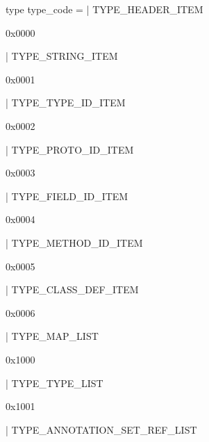 \documentclass[11pt]{article}
\begin{document}
\label{type:Dex.type-underscorecode}\begin{ocamldoccode}
type type_code =
  | TYPE_HEADER_ITEM
\end{ocamldoccode}
\begin{ocamldoccomment}
0x0000
\end{ocamldoccomment}
\begin{ocamldoccode}
  | TYPE_STRING_ITEM
\end{ocamldoccode}
\begin{ocamldoccomment}
0x0001
\end{ocamldoccomment}
\begin{ocamldoccode}
  | TYPE_TYPE_ID_ITEM
\end{ocamldoccode}
\begin{ocamldoccomment}
0x0002
\end{ocamldoccomment}
\begin{ocamldoccode}
  | TYPE_PROTO_ID_ITEM
\end{ocamldoccode}
\begin{ocamldoccomment}
0x0003
\end{ocamldoccomment}
\begin{ocamldoccode}
  | TYPE_FIELD_ID_ITEM
\end{ocamldoccode}
\begin{ocamldoccomment}
0x0004
\end{ocamldoccomment}
\begin{ocamldoccode}
  | TYPE_METHOD_ID_ITEM
\end{ocamldoccode}
\begin{ocamldoccomment}
0x0005
\end{ocamldoccomment}
\begin{ocamldoccode}
  | TYPE_CLASS_DEF_ITEM
\end{ocamldoccode}
\begin{ocamldoccomment}
0x0006
\end{ocamldoccomment}
\begin{ocamldoccode}
  | TYPE_MAP_LIST
\end{ocamldoccode}
\begin{ocamldoccomment}
0x1000
\end{ocamldoccomment}
\begin{ocamldoccode}
  | TYPE_TYPE_LIST
\end{ocamldoccode}
\begin{ocamldoccomment}
0x1001
\end{ocamldoccomment}
\begin{ocamldoccode}
  | TYPE_ANNOTATION_SET_REF_LIST
\end{ocamldoccode}
\end{document}
